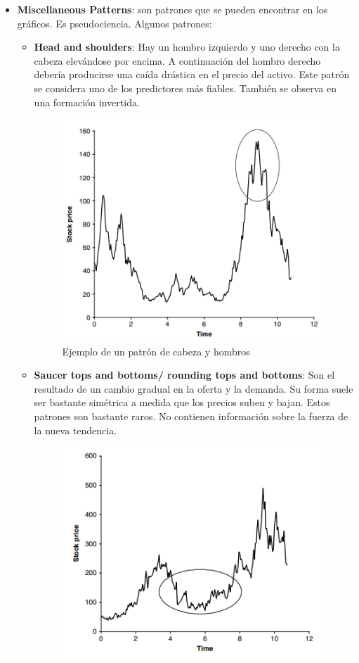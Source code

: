 \begin{itemize}
\begin{figure}[H]
        \end{figure}
    \item \textbf{Miscellaneous Patterns}: son patrones que se pueden encontrar en los gráficos. Es pseudociencia. Algunos patrones:
        \begin{itemize}
            \item \textbf{Head and shoulders}: Hay un hombro izquierdo y uno derecho con la cabeza elevándose por encima. A continuación del hombro derecho debería producirse una caída drástica en el precio del activo. Este patrón se considera uno de los predictores más fiables. También se observa en una formación invertida.
                \begin{figure}[H]
                    \centering
                    \includegraphics[width=0.65\linewidth]{Imagenes/Parte1/16_Prediccion/Head and shoulders.png}
                    \caption{Ejemplo de un patrón de cabeza y hombros}
                \end{figure}
            \item \textbf{Saucer tops and bottoms/ rounding tops and bottoms}: Son el resultado de un cambio gradual en la oferta y la demanda. Su forma suele ser bastante simétrica a medida que los precios suben y bajan. Estos patrones son bastante raros. No contienen información sobre la fuerza de la nueva tendencia.
                \begin{figure}[H]
                    \centering
                    \includegraphics[width=0.65\linewidth]{Imagenes/Parte1/16_Prediccion/Saucer bottom.png}

\end{figure}
\end{itemize}
\end{itemize}
